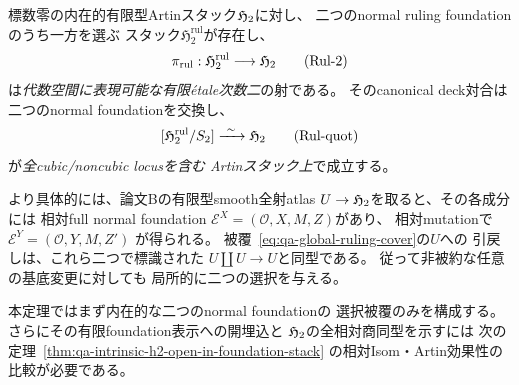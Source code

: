 \begin{theorem}[内在的二ruling選択の大域有限étale二重被覆]
\label{thm:qa-global-two-ruling-etale-cover}
標数零の内在的有限型Artinスタック$\mathfrak H_2$に対し、
二つのnormal ruling foundationのうち一方を選ぶ
スタック$\mathfrak H_2^{\mathrm{rul}}$が存在し、
\[
 \pi_{\mathrm{rul}}:
 \mathfrak H_2^{\mathrm{rul}}\longrightarrow\mathfrak H_2
 \tag{Rul-2}\label{eq:qa-global-ruling-cover}
\]
は\emph{代数空間に表現可能な有限étale次数二}の射である。
そのcanonical deck対合は二つのnormal foundationを交換し、
\[
 [\mathfrak H_2^{\mathrm{rul}}/S_2]
       \xrightarrow{\ \sim\ }\mathfrak H_2
 \tag{Rul-quot}\label{eq:qa-global-ruling-quotient}
\]
が\emph{全cubic/noncubic locusを含む
Artinスタック上}で成立する。

より具体的には、論文Bの有限型smooth全射atlas
$U\to\mathfrak H_2$を取ると、その各成分には
相対full normal foundation
$\mathcal E^X=(\mathcal O,X,M,Z)$があり、
相対mutationで
$\mathcal E^Y=(\mathcal O,Y,M,Z')$
が得られる。
被覆~\eqref{eq:qa-global-ruling-cover}の$U$への
引戻しは、これら二つで標識された
$U\amalg U\to U$と同型である。
従って非被約な任意の基底変更に対しても
局所的に二つの選択を与える。

本定理ではまず内在的な二つのnormal foundationの
選択被覆のみを構成する。
さらにその有限foundation表示への開埋込と
$\mathfrak H_2$の全相対商同型を示すには
次の定理~\ref{thm:qa-intrinsic-h2-open-in-foundation-stack}
の相対Isom・Artin効果性の比較が必要である。
\end{theorem}
